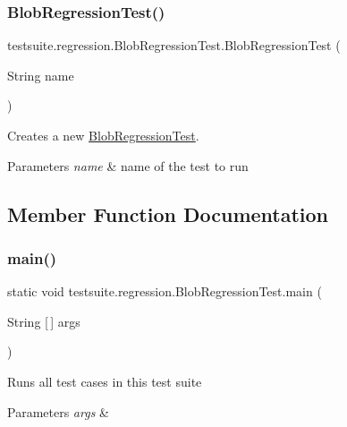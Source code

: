 \subsubsection{\texorpdfstring{Blob\+Regression\+Test()}{BlobRegressionTest()}}
{\footnotesize\ttfamily testsuite.\+regression.\+Blob\+Regression\+Test.\+Blob\+Regression\+Test (\begin{DoxyParamCaption}\item[{String}]{name }\end{DoxyParamCaption})}

Creates a new \mbox{\hyperlink{classtestsuite_1_1regression_1_1_blob_regression_test}{Blob\+Regression\+Test}}.


\begin{DoxyParams}{Parameters}
{\em name} & name of the test to run \\
\hline
\end{DoxyParams}


\subsection{Member Function Documentation}
\mbox{\label{classtestsuite_1_1regression_1_1_blob_regression_test_a73ef0a3e9cca8b19e17d3eebc78da04c}} 
\subsubsection{\texorpdfstring{main()}{main()}}
{\footnotesize\ttfamily static void testsuite.\+regression.\+Blob\+Regression\+Test.\+main (\begin{DoxyParamCaption}\item[{String \mbox{[}$\,$\mbox{]}}]{args }\end{DoxyParamCaption})\hspace{0.3cm}{\ttfamily [static]}}

Runs all test cases in this test suite


\begin{DoxyParams}{Parameters}
{\em args} & \\
\hline
\end{DoxyParams}
\mbox{\label{classtestsuite_1_1regression_1_1_blob_regression_test_a3e0ce3dcc8dd672e82db74e248d09044}} 
